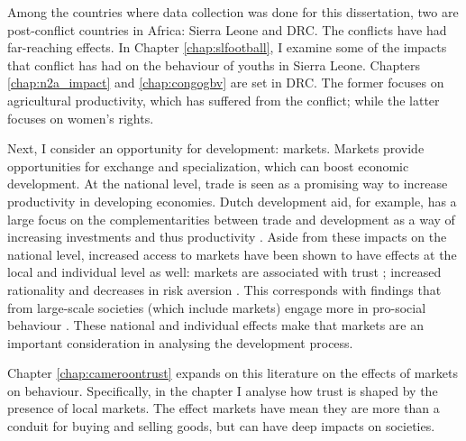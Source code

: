Among the countries where data collection was done for this dissertation, two are post-conflict countries in Africa: Sierra Leone and DRC. The conflicts have had far-reaching effects. In Chapter \ref{chap:slfootball}, I examine some of the impacts that conflict has had on the behaviour of youths in Sierra Leone. Chapters \ref{chap:n2a_impact} and \ref{chap:congogbv} are set in DRC. The former focuses on agricultural productivity, which has suffered from the conflict; while the latter focuses on women's rights. %

Next, I consider an opportunity for development: markets. Markets provide opportunities for exchange and specialization, which can boost economic development. At the national level, trade is seen as a promising way to increase productivity in developing economies. Dutch development aid, for example, has a large focus on the complementarities between trade and development as a way of increasing investments and thus productivity \citep[see e.g.][]{Zoomers2014}. Aside from these impacts on the national level, increased access to markets have been shown to have effects at the local and individual level as well: markets are associated with trust \citep{Tu2010,Fischer2008}; increased rationality \citep{List2008,Cecchi2013,Braga2009} and decreases in risk aversion \citep{Melesse2015}. This corresponds with findings that from large-scale societies (which include markets) engage more in pro-social behaviour \cite{Henrich2005,Henrich2010}. These national and individual effects make that markets are an important consideration in analysing the development process. 

Chapter \ref{chap:cameroontrust} expands on this literature on the effects of markets on behaviour. Specifically, in the chapter I analyse how trust is shaped by the presence of local markets. The effect markets have mean they are more than a conduit for buying and selling goods, but can have deep impacts on societies.

